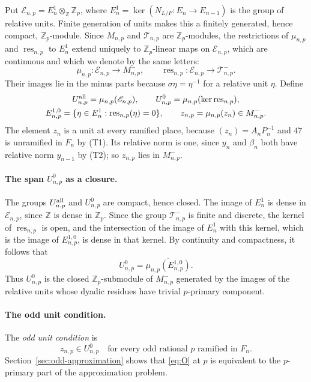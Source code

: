 \documentclass[11pt]{article}
\theoremstyle{plain}
\theoremstyle{definition}
\theoremstyle{remark}
\newcommand{\Z}{\mathbb Z}
\begin{document}
Put $\mathscr E_{n,p}=E_n^1\otimes_\Z\Z_p$, where
$E_n^1=\ker(N_{L/F}:E_n\to E_{n-1})$ is the group of relative units.
Finite generation of units \cite[Theorem 5.1]{MilneANT} makes this a
finitely generated, hence compact, $\Z_p$-module.  Since $M_{n,p}$ and
$\mathcal T_{n,p}$ are $\Z_p$-modules, the restrictions of $\mu_{n,p}$
and $\operatorname{res}_{n,p}$ to $E_n^1$ extend uniquely to
$\Z_p$-linear maps on $\mathscr E_{n,p}$, which are continuous and which
we denote by the same letters:
\[
 \mu_{n,p}:\mathscr E_{n,p}\to M_{n,p}^-,\qquad
 \operatorname{res}_{n,p}:\mathscr E_{n,p}\to\mathcal T_{n,p}^-.
\]
Their images lie in the minus parts because $\sigma\eta=\eta^{-1}$ for a
relative unit $\eta$.  Define
\begin{equation}\label{eq:odd-images}
 \begin{gathered}
 U_{n,p}^{\rm all}=\mu_{n,p}(\mathscr E_{n,p}),\qquad
 U_{n,p}^0=\mu_{n,p}(\ker\operatorname{res}_{n,p}),\\
 E_{n,p}^{1,0}=\{\eta\in E_n^1:\operatorname{res}_{n,p}(\eta)=0\},\qquad
 z_{n,p}=\mu_{n,p}(z_n)\in M_{n,p}^-.
 \end{gathered}
\end{equation}
The element $z_n$ is a unit at every ramified place, because
$(z_n)=A_nP_n^{-1}$ and $47$ is unramified in $F_n$ by \textup{(T1)}.  Its
relative norm is one, since $y_n$ and $\beta_n$ both have relative norm
$y_{n-1}$ by \textup{(T2)}; so $z_{n,p}$ lies in $M_{n,p}^-$.

\paragraph{The span $U^0_{n,p}$ as a closure.}  The groups
$U_{n,p}^{\rm all}$ and $U_{n,p}^0$ are compact, hence closed.  The image
of $E_n^1$ is dense in $\mathscr E_{n,p}$, since $\Z$ is dense in $\Z_p$.
Since the group $\mathcal T^-_{n,p}$ is finite and discrete, the kernel of
$\operatorname{res}_{n,p}$ is open, and the intersection of the image of
$E_n^1$ with this kernel, which is the image of $E_{n,p}^{1,0}$, is dense
in that kernel.  By continuity and compactness, it follows that
\begin{equation}\label{eq:relative-kernel-closure}
 U_{n,p}^0=\overline{\mu_{n,p}(E_{n,p}^{1,0})}.
\end{equation}
Thus $U_{n,p}^0$ is the closed $\Z_p$-submodule of $M_{n,p}^-$
generated by the images of the relative units whose dyadic residues have
trivial $p$-primary component.

\paragraph{The odd unit condition.}  The \emph{odd unit condition} is
\begin{equation}\label{eq:O}
 \tag{O} z_{n,p}\in U_{n,p}^0
       \quad\text{for every odd rational }p\text{ ramified in }F_n.
\end{equation}
Section~\ref{sec:odd-approximation} shows that \eqref{eq:O} at $p$ is
equivalent to the $p$-primary part of the approximation problem.
\end{document}
